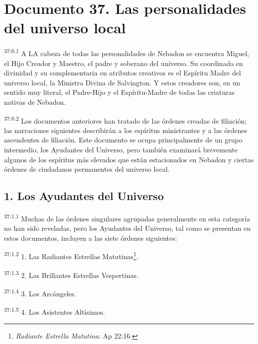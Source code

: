 \chapter{Documento 37. Las personalidades del universo local}
\par
\textsuperscript{37:0.1} A LA cabeza de todas las personalidades de Nebadon se encuentra Miguel, el Hijo Creador y Maestro, el padre y soberano del universo. Su coordinada en divinidad y su complementaria en atributos creativos es el Espíritu Madre del universo local, la Ministra Divina de Salvington. Y estos creadores son, en un sentido muy literal, el Padre-Hijo y el Espíritu-Madre de todas las criaturas nativas de Nebadon.

\par
\textsuperscript{37:0.2} Los documentos anteriores han tratado de las órdenes creadas de filiación; las narraciones siguientes describirán a los espíritus ministrantes y a las órdenes ascendentes de filiación. Este documento se ocupa principalmente de un grupo intermedio, los Ayudantes del Universo, pero también examinará brevemente algunos de los espíritus más elevados que están estacionados en Nebadon y ciertas órdenes de ciudadanos permanentes del universo local.

\section*{1. Los Ayudantes del Universo}
\par
\textsuperscript{37:1.1} Muchas de las órdenes singulares agrupadas generalmente en esta categoría no han sido reveladas, pero los Ayudantes del Universo, tal como se presentan en estos documentos, incluyen a las siete órdenes siguientes:

\par
\textsuperscript{37:1.2} 1. Las Radiantes Estrellas Matutinas\footnote{\textit{Radiante Estrella Matutina}: Ap 22:16.}.

\par
\textsuperscript{37:1.3} 2. Las Brillantes Estrellas Vespertinas.

\par
\textsuperscript{37:1.4} 3. Los Arcángeles.

\par
\textsuperscript{37:1.5} 4. Los Asistentes Altísimos.

